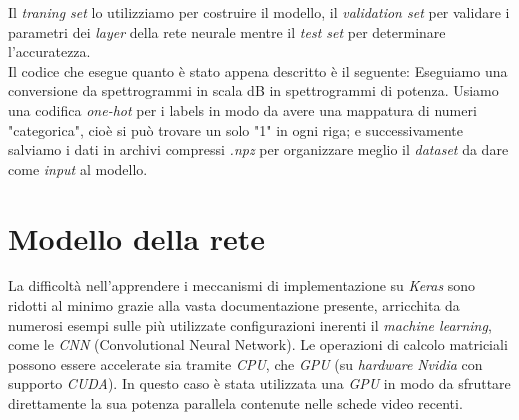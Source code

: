 Il \textit{traning set} lo utilizziamo per costruire il modello, il \textit{validation set} per validare i parametri dei \textit{layer} della rete neurale mentre il \textit{test set} per determinare l'accuratezza.\\
\newline Il codice che esegue quanto è stato appena descritto è il seguente:
\vspace*{2ex}
\vspace*{2ex}
\noindent Eseguiamo una conversione da spettrogrammi in scala dB in spettrogrammi di potenza.
\vspace*{2ex}
\vspace*{2ex}
\noindent Usiamo una codifica \textit{one-hot} per i labels in modo da avere una mappatura di numeri "categorica", cioè si può trovare un solo "1" in ogni riga; e successivamente salviamo i dati in archivi compressi \textit{.npz} per organizzare meglio il \textit{dataset} da dare come \textit{input} al modello.
\vspace*{2ex}
\vspace*{2ex}

\section{Modello della rete}
La difficoltà nell’apprendere i meccanismi di implementazione su \textit{Keras} sono ridotti al minimo grazie alla vasta documentazione presente, arricchita da numerosi esempi sulle più utilizzate configurazioni inerenti il \textit{machine learning}, come le \textit{CNN} (Convolutional Neural Network).
Le operazioni di calcolo matriciali possono essere accelerate sia tramite \textit{CPU}, che \textit{GPU} (su \textit{hardware} \textit{Nvidia} con supporto \textit{CUDA}). In questo caso è stata utilizzata una \textit{GPU} in modo da sfruttare direttamente la sua potenza parallela contenute nelle schede video recenti.
\vspace*{2ex}
\vspace*{2ex}


